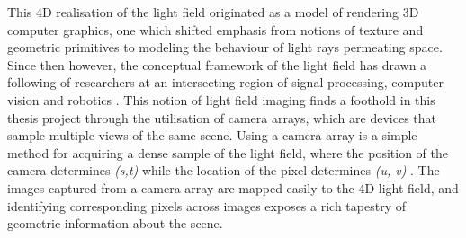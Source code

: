 \documentclass[openany]{book}
\begin{document}
This 4D realisation of the light field originated as a model of rendering 3D computer graphics, one which shifted emphasis from notions of texture and geometric primitives to modeling the behaviour of light rays permeating space. Since then however, the conceptual framework of the light field has drawn a following of researchers at an intersecting region of signal processing, computer vision and robotics \cite{dansereau2014phd}. This notion of light field imaging finds a foothold in this thesis project through the utilisation of camera arrays, which are devices that sample multiple views of the same scene. Using a camera array is a simple method for acquiring a dense sample of the light field, where the position of the camera determines \textit{(s,t)} while the location of the pixel determines \textit{(u, v)} \cite{yao2016camarray}. The images captured from a camera array are mapped easily to the 4D light field, and identifying corresponding pixels across images exposes a rich tapestry of geometric information about the scene. 
\end{document}
